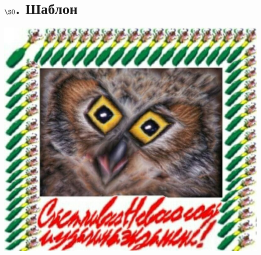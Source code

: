 \documentclass[../main.tex]{subfiles}
\begin{document}
\section*{$\S 0$. Шаблон}

\includegraphics[scale=0.7]{example.jpg} 
\end{document}
